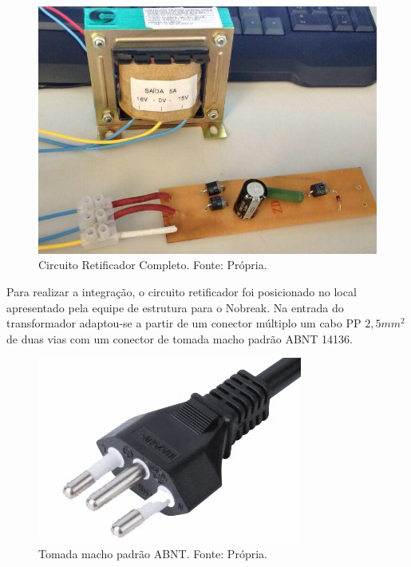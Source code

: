                \begin{figure}[!htb]
            		\centering
            		\includegraphics[scale= 0.4]{figuras/Circuito_Retificador_Completo.png}
            		\caption{Circuito Retificador Completo. Fonte: Própria.}
            		\label{retificador-completo2}
            	\end{figure}	
            	
				Para realizar a integração, o circuito retificador foi posicionado no 							local apresentado pela equipe de estrutura para o Nobreak. Na entrada do 						transformador adaptou-se a partir de um conector múltiplo um cabo PP $2,5mm^2$ 				de duas vias com um conector de tomada macho padrão ABNT 14136.             	

                \begin{figure}[!htb]
            		\centering
            		\includegraphics[scale= 0.4]{figuras/Pardrao_tomada.jpg}
            		\caption{Tomada macho padrão ABNT. Fonte: Própria.}
            		\label{tomada}
            	\end{figure}	 
            	
